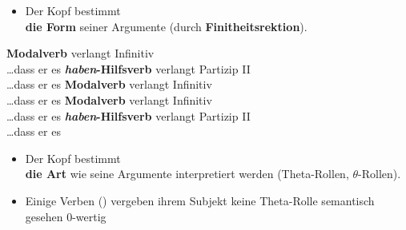 \begin{frame}

\begin{itemize}
	\item Der Kopf bestimmt\\ 
	\textbf{die Form} seiner Argumente (\zB durch \textbf{Finitheitsrektion}).
\end{itemize}

\ea \textbf{Modalverb} verlangt Infinitiv\\
\dots dass er es 
\pause
\ex \textbf{\emph{haben}-Hilfsverb} verlangt Partizip II\\
\dots dass er es 
\pause
\ex \textbf{Modalverb} verlangt Infinitiv\\
\dots dass er es 
\pause
\ex \textbf{Modalverb} verlangt Infinitiv\\
\dots dass er es 
\pause
\ex \textbf{\emph{haben}-Hilfsverb} verlangt Partizip II\\
\dots dass er es 
\z

\end{frame}


\begin{frame}

\begin{itemize}
	\item Der Kopf bestimmt\\ 
	\textbf{die Art} wie seine Argumente interpretiert werden (Theta-Rollen, $\theta$-Rollen).

\eal 
{}
\zl

\eal
{}
\zl


	\item Einige Verben (\zB {}) vergeben ihrem Subjekt keine Theta-Rolle \ras semantisch gesehen 0-wertig

\end{itemize}

\end{frame}


